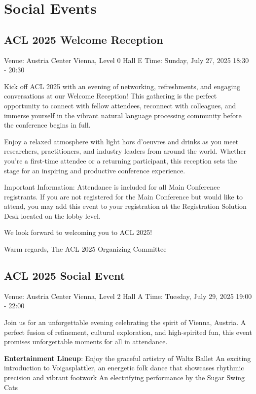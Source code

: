 \chapter{Social Events}

\section{ACL 2025 Welcome Reception}
\vspace*{0.2cm}

Venue: Austria Center Vienna, Level 0 Hall E
Time: Sunday, July 27, 2025 18:30 - 20:30

Kick off ACL 2025 with an evening of networking, refreshments, and engaging conversations at our Welcome Reception! This gathering is the perfect opportunity to connect with fellow attendees, reconnect with colleagues, and immerse yourself in the vibrant natural language processing community before the conference begins in full.

Enjoy a relaxed atmosphere with light hors d’oeuvres and drinks as you meet researchers, practitioners, and industry leaders from around the world. Whether you're a first-time attendee or a returning participant, this reception sets the stage for an inspiring and productive conference experience.

Important Information:
Attendance is included for all Main Conference registrants.
If you are not registered for the Main Conference but would like to attend, you may add this event to your registration at the Registration Solution Desk located on the lobby level.

We look forward to welcoming you to ACL 2025!

Warm regards,
The ACL 2025 Organizing Committee

\section{ACL 2025 Social Event}
\vspace*{0.2cm}

Venue: Austria Center Vienna, Level 2 Hall A
Time: Tuesday, July 29, 2025 19:00 - 22:00

Join us for an unforgettable evening celebrating the spirit of Vienna, Austria. A perfect fusion of refinement, cultural exploration, and high-spirited fun, this event promises unforgettable moments for all in attendance.

\textbf{Entertainment Lineup}:
Enjoy the graceful artistry of Waltz Ballet
An exciting introduction to Voigasplattler, an energetic folk dance that showcases rhythmic precision and vibrant footwork
An electrifying performance by the Sugar Swing Cats


